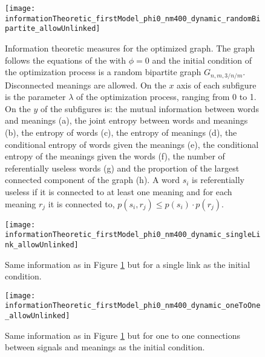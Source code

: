 \begin{figure}
  \centering
  \texttt{[image: informationTheoretic\_firstModel\_phi0\_nm400\_dynamic\_randomBipartite\_allowUnlinked]}
  \caption{
    Information theoretic measures for the optimized graph.
    The graph follows the equations of the \firstmodel{} with $\phi=0$ and the initial condition of the optimization process is a random bipartite graph $G_{n,m,3/n/m}$. Disconnected meanings are allowed.
    On the $x$ axis of each subfigure is the parameter $\lambda$ of the optimization process, ranging from 0 to 1.
    On the $y$ of the subfigures is: the mutual information between words and meanings (a), the joint entropy between words and meanings (b), the entropy of words (c), the entropy of meanings (d), the conditional entropy of words given the meanings (e), the conditional entropy of the meanings given the words (f), the number of referentially useless words (g) and the proportion of the largest connected component of the graph (h).
    A word $s_i$ is referentially useless if it is connected to at least one meaning and for each meaning $r_j$ it is connected to, $p(s_i,r_j) \leq p(s_i) \cdot p(r_j)$.
}
  \label{fig:informationTheoretic_firstModel_phi0_nm400_dynamic_randomBipartite_allowUnlinked}
\end{figure}

\begin{figure}
  \centering
  \texttt{[image: informationTheoretic\_firstModel\_phi0\_nm400\_dynamic\_singleLink\_allowUnlinked]}
  \caption{Same information as in Figure \ref{fig:informationTheoretic_firstModel_phi0_nm400_dynamic_randomBipartite_allowUnlinked} but for a single link as the initial condition.}
  \label{fig:informationTheoretic_firstModel_phi0_nm400_dynamic_singleLink_allowUnlinked}
\end{figure}

\begin{figure}
  \centering
  \texttt{[image: informationTheoretic\_firstModel\_phi0\_nm400\_dynamic\_oneToOne\_allowUnlinked]}
  \caption{Same information as in Figure \ref{fig:informationTheoretic_firstModel_phi0_nm400_dynamic_randomBipartite_allowUnlinked} but for one to one connections between signals and meanings as the initial condition.}
  \label{fig:informationTheoretic_firstModel_phi0_nm400_dynamic_oneToOne_allowUnlinked}
\end{figure}

